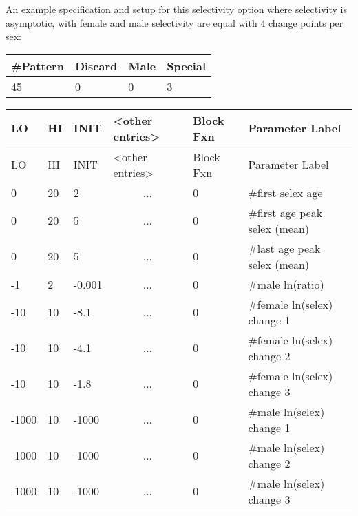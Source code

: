 An example specification and setup for this selectivity option where selectivity is asymptotic, with female and male selectivity are equal with 4 change points per sex:
	\begin{center}
		\begin{longtable}{p{1.5cm} p{1.5cm} p{1.5cm} p{1.5cm} }
			\hline
			\#Pattern & Discard & Male & Special\Tstrut\Bstrut\\
			\hline
			45 & 0 & 0 & 3 \Tstrut\Bstrut\\
			\hline
		\end{longtable}
	\end{center}
		

	\begin{longtable}{p{1cm} p{1cm} p{1cm} p{2.9cm}  p{1.8cm}  p{5.1cm}}
		\hline
		LO \Tstrut & HI & INIT  &  <other entries> & Block Fxn & Parameter Label\Bstrut\\
		\hline
		\endfirsthead
		
		\hline
		LO \Tstrut & HI & INIT & <other entries> & Block Fxn & Parameter Label\Bstrut\\
		\hline
		\endhead

		0     & 20 &  2     &  \multicolumn{1}{c}{...} & 0 & \#first selex age \Tstrut\\
		0     & 20 &  5     &  \multicolumn{1}{c}{...} & 0 & \#first age peak selex (mean) \\
		0     & 20 &  5     &  \multicolumn{1}{c}{...} & 0 & \#last age peak selex (mean) \\
		-1    &  2 & -0.001 &  \multicolumn{1}{c}{...} & 0 & \#male ln(ratio) \\
		-10   & 10 & -8.1   &  \multicolumn{1}{c}{...} & 0 & \#female ln(selex) change 1\\
		-10   & 10 & -4.1   &  \multicolumn{1}{c}{...} & 0 & \#female ln(selex) change 2\\
		-10   & 10 & -1.8   &  \multicolumn{1}{c}{...} & 0 & \#female ln(selex) change 3\\
		-1000 & 10 & -1000  &  \multicolumn{1}{c}{...} & 0 & \#male ln(selex) change 1\\
		-1000 & 10 & -1000  &  \multicolumn{1}{c}{...} & 0 & \#male ln(selex) change 2\\
		-1000 & 10 & -1000  &  \multicolumn{1}{c}{...} & 0 & \#male ln(selex) change 3\Bstrut\\
		\hline
	\end{longtable}

